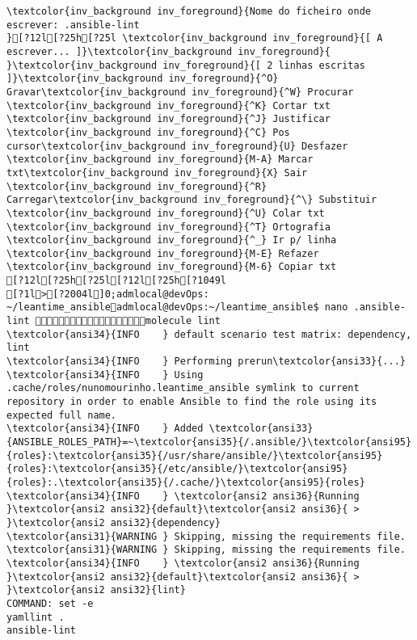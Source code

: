 \documentclass{scrartcl}
\begin{document}
\begin{Verbatim}
\textcolor{inv_background inv_foreground}{Nome do ficheiro onde escrever: .ansible-lint                                                                                             }[?12l[?25h[?25l \textcolor{inv_background inv_foreground}{[ A escrever... ]}\textcolor{inv_background inv_foreground}{          }\textcolor{inv_background inv_foreground}{[ 2 linhas escritas ]}\textcolor{inv_background inv_foreground}{^O} Gravar\textcolor{inv_background inv_foreground}{^W} Procurar      \textcolor{inv_background inv_foreground}{^K} Cortar txt    \textcolor{inv_background inv_foreground}{^J} Justificar    \textcolor{inv_background inv_foreground}{^C} Pos cursor\textcolor{inv_background inv_foreground}{U} Desfazer     \textcolor{inv_background inv_foreground}{M-A} Marcar txt\textcolor{inv_background inv_foreground}{X} Sair    \textcolor{inv_background inv_foreground}{^R} Carregar\textcolor{inv_background inv_foreground}{^\} Substituir    \textcolor{inv_background inv_foreground}{^U} Colar txt     \textcolor{inv_background inv_foreground}{^T} Ortografia    \textcolor{inv_background inv_foreground}{^_} Ir p/ linha   \textcolor{inv_background inv_foreground}{M-E} Refazer      \textcolor{inv_background inv_foreground}{M-6} Copiar txt
[?12l[?25h[?25l[?12l[?25h[?1049l
[?1l>[?2004l]0;admlocal@devOps: ~/leantime_ansibleadmlocal@devOps:~/leantime_ansible$ nano .ansible-lint molecule lint
\textcolor{ansi34}{INFO    } default scenario test matrix: dependency, lint
\textcolor{ansi34}{INFO    } Performing prerun\textcolor{ansi33}{...}
\textcolor{ansi34}{INFO    } Using .cache/roles/nunomourinho.leantime_ansible symlink to current repository in order to enable Ansible to find the role using its expected full name.
\textcolor{ansi34}{INFO    } Added \textcolor{ansi33}{ANSIBLE_ROLES_PATH}=~\textcolor{ansi35}{/.ansible/}\textcolor{ansi95}{roles}:\textcolor{ansi35}{/usr/share/ansible/}\textcolor{ansi95}{roles}:\textcolor{ansi35}{/etc/ansible/}\textcolor{ansi95}{roles}:.\textcolor{ansi35}{/.cache/}\textcolor{ansi95}{roles}
\textcolor{ansi34}{INFO    } \textcolor{ansi2 ansi36}{Running }\textcolor{ansi2 ansi32}{default}\textcolor{ansi2 ansi36}{ > }\textcolor{ansi2 ansi32}{dependency}
\textcolor{ansi31}{WARNING } Skipping, missing the requirements file.
\textcolor{ansi31}{WARNING } Skipping, missing the requirements file.
\textcolor{ansi34}{INFO    } \textcolor{ansi2 ansi36}{Running }\textcolor{ansi2 ansi32}{default}\textcolor{ansi2 ansi36}{ > }\textcolor{ansi2 ansi32}{lint}
COMMAND: set -e
yamllint .
ansible-lint


\end{Verbatim}
\end{document}

